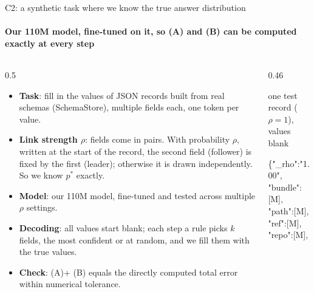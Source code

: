 \documentclass[aspectratio=169,10pt,t]{beamer}
\newcommand{\A}{{\color{dep}\firasemibold (A)}\xspace}
\newcommand{\B}{{\color{est}\firasemibold (B)}\xspace}
\begin{document}
\begin{frame}{C2: a synthetic task where we know the true answer distribution}
  \framesubtitle{Our 110M model, fine-tuned on it, so (A) and (B) can be computed exactly at every step}
  \vspace{1mm}
  \begin{columns}[T,onlytextwidth]
    \begin{column}{0.5\textwidth}
      \begin{itemize}\footnotesize
        \item \textbf{Task}: fill in the values of JSON records built from real
              schemas (SchemaStore), multiple fields each, one token per value.
        \item \textbf{Link strength $\rho$}: fields come in pairs. With probability $\rho$, written
              at the start of the record, the second field (follower) is fixed by the first
              (leader); otherwise it is drawn independently. So we know $p^{*}$ exactly.
        \item \textbf{Model}: our 110M model, fine-tuned and tested across multiple $\rho$ settings.
        \item \textbf{Decoding}: all values start blank; each step a rule picks $k$ fields, the most
              confident or at random, and we fill them with the true values.
        \item \textbf{Check}: \A + \B equals the directly computed total error within numerical tolerance.
      \end{itemize}
    \end{column}
    \begin{column}{0.46\textwidth}
      \vspace{1mm}
      \begin{panel}[colback=plane, colframe=plane]
        {\color{ink2}\scriptsize one test record ($\rho = 1$), values blank}\par\vspace{1mm}
        \ttfamily\scriptsize
        \{{\color{accentdark}"\_rho":"1.00"},\\
        \hspace*{2mm}"bundle":{\color{muted}[M]}, "path":{\color{muted}[M]},\\
        \hspace*{2mm}"ref":{\color{muted}[M]}, "repo":{\color{muted}[M]},\\

\end{panel}
\end{column}
\end{columns}
\end{frame}
\end{document}
